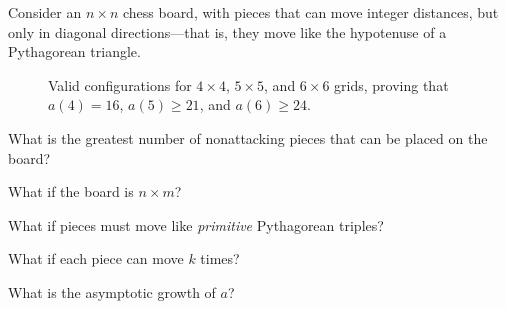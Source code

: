 \documentclass{article}
\begin{document}
Consider an $n \times n$ chess board, with pieces that can move integer
distances, but only in diagonal directions---that is, they move like the
hypotenuse of a Pythagorean triangle.
\begin{figure}[!h]
  \centering
   \hspace{1cm}
   \hspace{1cm}
   \hspace{1cm}
  \caption{
    Valid configurations for $4 \times 4$, $5 \times 5$, and $6 \times 6$ grids,
    proving that $a(4) = 16$, $a(5) \geq 21$, and $a(6) \geq 24$.}
\end{figure}

\begin{question}
  What is the greatest number of nonattacking pieces that can be placed on the board?
\end{question}

\begin{related}
  \item What if the board is $n \times m$?
  \item What if pieces must move like \textit{primitive} Pythagorean triples?
  \item What if each piece can move $k$ times?
  \item What is the asymptotic growth of $a$?
\end{related}
\end{document}

